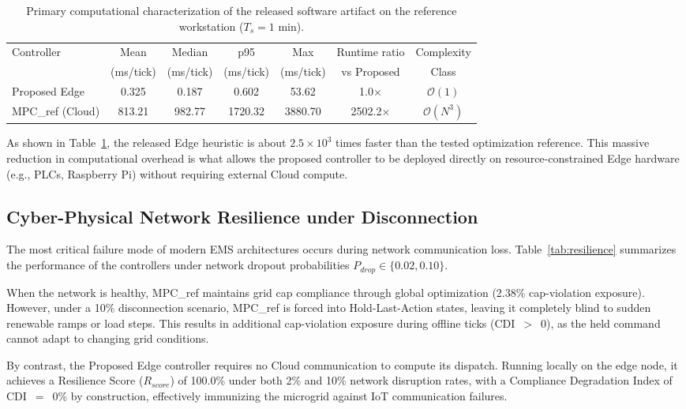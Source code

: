 \documentclass[preprint,12pt]{elsarticle}
\def\texttt#1{#1}%
\begin{document}
\begin{table}[H]
\centering
\caption{Primary computational characterization of the released software artifact on the reference workstation ($T_s=1$ min).}
\label{tab:comp_primary}
\footnotesize
\setlength{\tabcolsep}{4pt}
\renewcommand{\arraystretch}{1.06}
\begin{tabularx}{\textwidth}{@{} l c c c c c c @{}}
\toprule
Controller & Mean & Median & p95 & Max & Runtime ratio & Complexity \\
 & (ms/tick) & (ms/tick) & (ms/tick) & (ms/tick) & vs Proposed & Class \\
\midrule
Proposed Edge & 0.325 & 0.187 & 0.602 & 53.62 & 1.0$\times$ & $\mathcal{O}(1)$ \\
MPC\_ref (Cloud) & 813.21 & 982.77 & 1720.32 & 3880.70 & 2502.2$\times$ & $\mathcal{O}(N^3)$ \\
\bottomrule
\end{tabularx}
\end{table}

As shown in Table~\ref{tab:comp_primary}, the released Edge heuristic is about $2.5\times 10^3$ times faster than the tested optimization reference. This massive reduction in computational overhead is what allows the proposed controller to be deployed directly on resource-constrained Edge hardware (e.g., PLCs, Raspberry Pi) without requiring external Cloud compute.

\subsection{Cyber-Physical Network Resilience under Disconnection}
The most critical failure mode of modern EMS architectures occurs during network communication loss. Table~\ref{tab:resilience} summarizes the performance of the controllers under network dropout probabilities $P_{drop} \in \{0.02, 0.10\}$.

When the network is healthy, \texttt{MPC\_ref} maintains grid cap compliance through global optimization (2.38\% cap-violation exposure). However, under a 10\% disconnection scenario, \texttt{MPC\_ref} is forced into Hold-Last-Action states, leaving it completely blind to sudden renewable ramps or load steps. This results in additional cap-violation exposure during offline ticks (CDI~$>$~0), as the held command cannot adapt to changing grid conditions.

By contrast, the Proposed Edge controller requires no Cloud communication to compute its dispatch. Running locally on the edge node, it achieves a Resilience Score ($R_{score}$) of 100.0\% under both 2\% and 10\% network disruption rates, with a Compliance Degradation Index of CDI~$=$~0\% by construction, effectively immunizing the microgrid against IoT communication failures.
\end{document}

